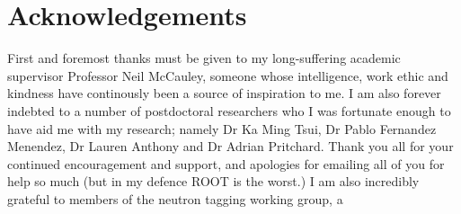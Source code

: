 \chapter*{Acknowledgements}
\thispagestyle{empty}

First and foremost thanks must be given to my long-suffering academic supervisor Professor Neil McCauley, someone whose intelligence, work ethic and kindness have continously been a source of inspiration to me. 
\newline
I am also forever indebted to a number of postdoctoral researchers who I was fortunate enough to have aid me with my research; namely Dr Ka Ming Tsui, Dr Pablo Fernandez Menendez, Dr Lauren Anthony and Dr Adrian Pritchard. Thank you all for your continued encouragement and support, and apologies for emailing all of you for help so much (but in my defence ROOT is the worst.)
\newline
I am also incredibly grateful to members of the neutron tagging working group, a